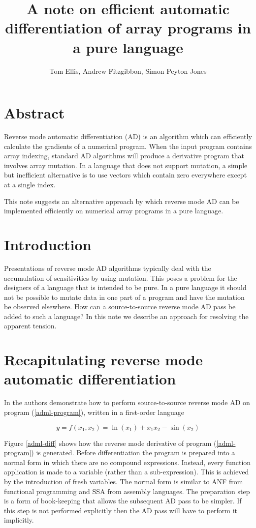 \documentclass[12pt]{article}
\title{A note on efficient automatic differentiation of array programs
  in a pure language}
\author{Tom Ellis, Andrew Fitzgibbon, Simon Peyton Jones}
\begin{document}
\maketitle

\section{Abstract}

Reverse mode automatic differentiation (AD) is an algorithm which can
efficiently calculate the gradients of a numerical program.  When the
input program contains array indexing, standard AD algorithms will
produce a derivative program that involves array mutation.  In a
language that does not support mutation, a simple but inefficient
alternative is to use vectors which contain zero everywhere except at
a single index.

This note suggests an alternative approach by which reverse mode AD
can be implemented efficiently on numerical array programs in a pure
language.

\section{Introduction}

Presentations of reverse mode AD algorithms typically deal with the
accumulation of sensitivities by using mutation.  This poses a problem
for the designers of a language that is intended to be pure.  In a
pure language it should not be possible to mutate data in one part of
a program and have the mutation be observed elsewhere.  How can a
source-to-source reverse mode AD pass be added to such a language?  In
this note we describe an approach for resolving the apparent tension.

\section{Recapitulating reverse mode automatic differentiation}

In \cite{adml} the authors demonstrate how to perform source-to-source
reverse mode AD on program (\ref{adml-program}), written in a
first-order language

\begin{equation}
\label {adml-program}
y = f(x_1, x_2) = \ln(x_1)+x_1 x_2-\sin(x_2)
\end{equation}

Figure \ref{adml-diff} shows how the reverse mode derivative of
program (\ref{adml-program}) is generated.  Before differentiation the
program is prepared into a normal form in which there are no compound
expressions. Instead, every function application is made to a variable
(rather than a sub-expression).  This is achieved by the introduction
of fresh variables.  The normal form is similar to ANF from functional
programming and SSA from assembly languages.  The preparation step is
a form of book-keeping that allows the subsequent AD pass to be
simpler.  If this step is not performed explicitly then the AD pass
will have to perform it implicitly.
\end{document}
